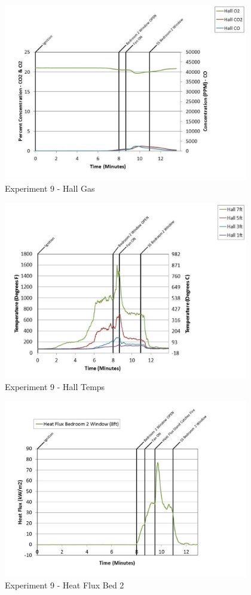 \documentclass{article}
\begin{document}
\begin{appendices}
	\clearpage

	\begin{figure}[h!]
		\centering
		\includegraphics[height=3.05in]{0_Images/Results_Charts/Exp_9_Charts/HallGas.pdf}
		\caption{Experiment 9 - Hall Gas}
	\end{figure}
 

	\begin{figure}[h!]
		\centering
		\includegraphics[height=3.05in]{0_Images/Results_Charts/Exp_9_Charts/HallTemps.pdf}
		\caption{Experiment 9 - Hall Temps}
	\end{figure}
 
	\clearpage

	\begin{figure}[h!]
		\centering
		\includegraphics[height=3.05in]{0_Images/Results_Charts/Exp_9_Charts/HeatFluxBed2.pdf}
		\caption{Experiment 9 - Heat Flux Bed 2}
	\end{figure}
 


\end{appendices}
\end{document}
